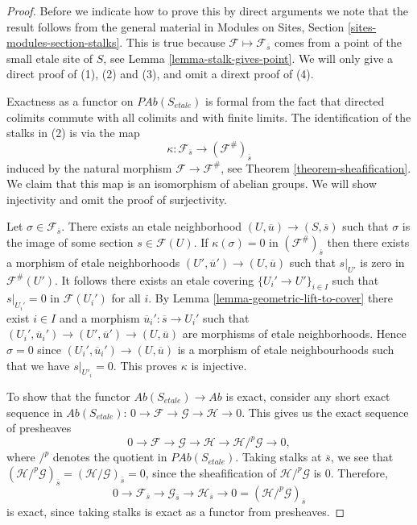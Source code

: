 \begin{proof}
Before we indicate how to prove this by direct arguments
we note that the result follows from the general material in
Modules on Sites, Section \ref{sites-modules-section-stalks}.
This is true because $\mathcal{F} \mapsto \mathcal{F}_{\overline{s}}$
comes from a point of the small etale site of $S$, see
Lemma \ref{lemma-stalk-gives-point}.
We will only give a direct proof of (1), (2) and (3), and omit
a dirext proof of (4).

\medskip\noindent
Exactness as a functor on $\textit{PAb}(S_{etale})$ is formal from the
fact that directed colimits commute with all colimits and with finite
limits. The identification of the stalks in (2) is via the map
$$
\kappa :
\mathcal{F}_{\overline{s}}
\longrightarrow
(\mathcal{F}^\#)_{\overline{s}}
$$
induced by the natural morphism $\mathcal{F}\to \mathcal{F}^\#$, see
Theorem \ref{theorem-sheafification}.
We claim that this map is an isomorphism of abelian groups. We will show
injectivity and omit the proof of surjectivity.

\medskip\noindent
Let $\sigma\in \mathcal{F}_{\overline{s}}$.
There exists an etale neighborhood
$(U, \overline{u})\to (S, \overline{s})$ such that $\sigma$ is the image of some
section $s \in \mathcal{F}(U)$. If $\kappa(\sigma) = 0$ in
$(\mathcal{F}^\#)_{\overline{s}}$ then there exists a morphism of etale
neighborhoods $(U', \overline{u}')\to (U, \overline{u})$ such that
$s|_{U'}$ is zero in $\mathcal{F}^\#(U')$. It follows there
exists an etale covering
$\{U_i'\to U'\}_{i\in I}$ such that $s|_{U_i'}=0$ in
$\mathcal{F}(U_i')$ for all $i$. By Lemma \ref{lemma-geometric-lift-to-cover}
there exist $i \in I$ and a morphism
$\overline{u}_i': \overline{s} \to U_i'$ such that
$(U_i', \overline{u}_i') \to (U', \overline{u}')\to (U, \overline{u})$
are morphisms of etale neighborhoods. Hence $\sigma = 0$
since $(U_i', \overline{u}_i') \to (U, \overline{u})$
is a morphism of etale neighbourhoods such that
we have $s|_{U'_i}=0$. This proves $\kappa$ is injective.

\medskip\noindent
To show that the functor $\textit{Ab}(S_{etale}) \to \textit{Ab}$ is
exact, consider any short exact sequence in $\textit{Ab}(S_{etale})$:
$
0\to \mathcal{F}\to \mathcal{G}\to \mathcal H \to 0.
$
This gives us the exact sequence of presheaves
$$
0 \to \mathcal{F} \to \mathcal{G} \to \mathcal H \to
\mathcal H/^p\mathcal{G} \to 0,
$$
where $/^p$ denotes the quotient in $\textit{PAb}(S_{etale})$. Taking stalks at
$\overline{s}$, we see that $(\mathcal H /^p\mathcal{G})_{\bar{s}} =
(\mathcal H /\mathcal{G})_{\bar{s}} = 0$, since the sheafification of
$\mathcal H/^p\mathcal{G}$ is $0$.
Therefore,
$$
0\to \mathcal{F}_{\overline{s}	} \to \mathcal{G}_{\overline{s}} \to
\mathcal{H}_{\overline{s}} \to 0 = (\mathcal H/^p\mathcal{G})_{\overline{s}}
$$
is exact, since taking stalks is exact as a functor from presheaves.
\end{proof}

